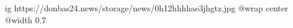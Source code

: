  
 
 
 
 

\ifcmt
  ig https://donbas24.news/storage/news/0h12hhhhae3jhgtz.jpg
  @wrap center
  @width 0.7
\fi
